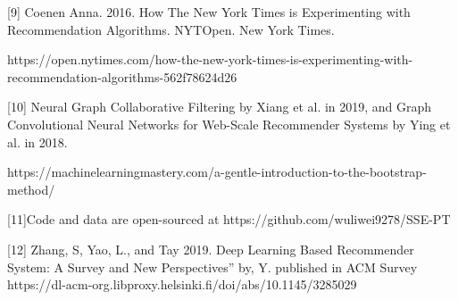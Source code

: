 \documentclass[english,twoside,censored,tkt,sw-line]{HYthesisML}
\begin{document}
[9] Coenen Anna. 2016. How The New York Times is Experimenting with Recommendation Algorithms. NYTOpen. New York Times.
\begin{sloppypar}
https://open.nytimes.com/how-the-new-york-times-is-experimenting-with-recommendation-algorithms-562f78624d26
\end{sloppypar}

[10] Neural Graph Collaborative Filtering by Xiang et al. in 2019, and Graph Convolutional Neural Networks for Web-Scale Recommender Systems by Ying et al. in 2018.

\begin{sloppypar}
https://machinelearningmastery.com/a-gentle-introduction-to-the-bootstrap-method/
\end{sloppypar}


[11]Code and data are open-sourced at
https://github.com/wuliwei9278/SSE-PT

[12] Zhang, S, Yao, L., and Tay 2019. Deep Learning Based Recommender System: A Survey and New Perspectives” by, Y. published in ACM Survey 
\newline
https://dl-acm-org.libproxy.helsinki.fi/doi/abs/10.1145/3285029
\end{document}
